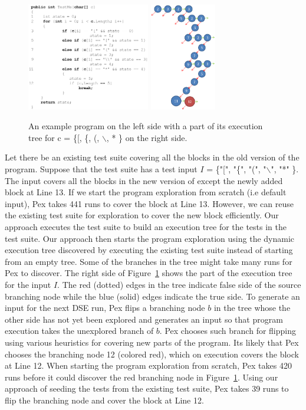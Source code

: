 \begin{figure}
\includegraphics[height=4.7cm, keepaspectratio]{Figures/Presentation3}
\includegraphics[height=4.7cm, keepaspectratio]{Figures/Presentation2}
\vspace{-0.2 in}
\scriptsize\caption{An example program on the left side with a part of its execution tree for c = \{[, \{, (, $\backslash$, * \} on the right side.}
\vspace{-0.2 in}
\label{fig:example2}
\end{figure}
Let there be an existing test suite covering all the blocks in the old version of the program. Suppose that the test suite has a test input $I$ = \{"[", "\{", "(", "$\backslash$", "*" \}. The input covers all the blocks in the new version of  except the newly added block at Line 13. If we start the program exploration from scratch (i.e default input), Pex takes 441 runs to cover the block at Line 13. However, we can reuse the existing test suite for exploration to cover the new block efficiently. Our approach executes the test suite to build an execution tree for the tests in the test suite. Our approach then starts the program exploration using the dynamic execution tree discovered by executing the existing test suite instead of starting from an empty tree. Some of the branches in the tree might take many runs for Pex to discover. The right side of Figure~\ref{fig:example2} shows the part of the execution tree for the input $I$. The red (dotted) edges in the tree indicate false side of the source branching node while the blue (solid) edges indicate the true side. To generate an input for the next DSE run, Pex flips a branching node $b$ in the tree whose the other side has not yet been explored and generates an input so that program execution takes the unexplored branch of $b$. Pex chooses such branch for flipping using various heuristics for covering new parts of the program. Its likely that Pex chooses the branching node 12 (colored red), which on execution covers the block at Line 12. When starting the program exploration from scratch, Pex takes 420 runs before it could discover the red branching node in Figure~\ref{fig:example2}. Using our approach of seeding the tests from the existing test suite, Pex takes 39 runs to flip the branching node and cover the block at Line 12. 
